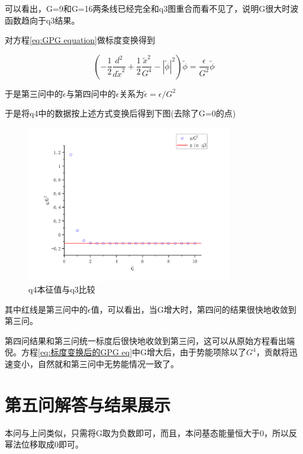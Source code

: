 \documentclass[10pt, a4paper]{article}
\begin{document}
    可以看出，G=9和G=16两条线已经完全和q3图重合而看不见了，说明G很大时波函数趋向于q3结果。

    对方程\ref{eq:GPG equation}做标度变换得到

    \begin{equation}\label{eq:标度变换后的GPG eq}
      (-\frac{1}{2}\frac{d^2}{d\tilde x^2}+\frac{1}{2}\frac{\tilde x^2}{G^4}-|\tilde \phi|^2)\tilde \phi=\frac\epsilon {G^2}\tilde \phi
    \end{equation}
     
    于是第三问中的$\tilde\epsilon$与第四问中的$\epsilon$关系为$\tilde\epsilon=\epsilon/G^2$

    于是将q4中的数据按上述方式变换后得到下图(去除了G=0的点)

    \begin{figure}[H]
      \centering
      \includegraphics[width=0.8\textwidth]{q4本征值与q3比较.jpg}
      \caption{q4本征值与q3比较}\label{fig:q4本征值与q3比较}
    \end{figure}

    其中红线是第三问中的$\epsilon$值，可以看出，当G增大时，第四问的结果很快地收敛到第三问。

    第四问结果和第三问统一标度后很快地收敛到第三问，这可以从原始方程看出端倪。方程\ref{eq:标度变换后的GPG eq}中G增大后，由于势能项除以了$G^4$，贡献将迅速变小，自然就和第三问中无势能情况一致了。

    \section{第五问解答与结果展示}

    本问与上问类似，只需将G取为负数即可，而且，本问基态能量恒大于0，所以反幂法位移取成0即可。
\end{document}
